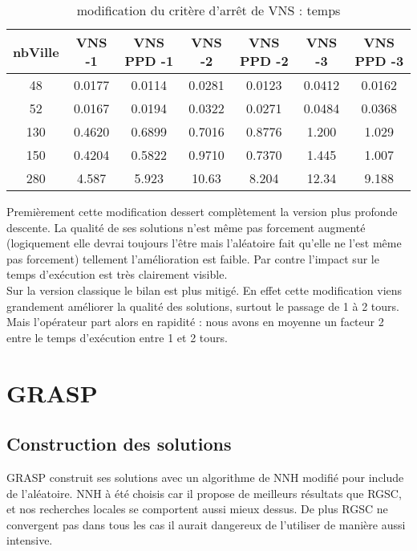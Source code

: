\documentclass[12pt,a4paper]{article}
\begin{document}
\begin{table}[!h]
\centering
\begin{tabular}{|*{7}{c|}}
  \hline
  nbVille & VNS -1 & VNS PPD -1 & VNS -2 & VNS PPD -2 & VNS -3 & VNS PPD -3 \\
  \hline
  48 & 0.0177 & 0.0114 & 0.0281 & 0.0123 & 0.0412 & 0.0162 \\ 
  52 & 0.0167 & 0.0194 & 0.0322 & 0.0271 & 0.0484 & 0.0368 \\
  130 & 0.4620 & 0.6899 & 0.7016 & 0.8776 & 1.200 & 1.029 \\
  150 & 0.4204 & 0.5822 & 0.9710 & 0.7370 & 1.445 & 1.007 \\  
  280 & 4.587 & 5.923 & 10.63 & 8.204 & 12.34 & 9.188 \\
  \hline
\end{tabular}
\caption{modification du critère d’arrêt de VNS : temps}
\label{stopingRuleVNStemps}
\end{table}

Premièrement cette modification dessert complètement la version plus profonde descente. La qualité de ses solutions n'est même pas forcement augmenté (logiquement elle devrai toujours l’être mais l’aléatoire fait qu'elle ne l'est même pas forcement) tellement l’amélioration est faible. Par contre l'impact sur le temps d’exécution est très clairement visible.\\

Sur la version classique le bilan est plus mitigé. En effet cette modification viens grandement améliorer la qualité des solutions, surtout le passage de 1 à 2 tours. Mais l'opérateur part alors en rapidité : nous avons en moyenne un facteur 2 entre le temps d’exécution entre 1 et 2 tours.\\ 

\section{GRASP}

\subsection{Construction des solutions}

GRASP construit ses solutions avec un algorithme de NNH modifié pour include de l'aléatoire. NNH à été choisis car il propose de meilleurs résultats que RGSC, et nos recherches locales se comportent aussi mieux dessus. De plus RGSC ne convergent pas dans tous les cas il aurait dangereux de l'utiliser de manière aussi intensive.\\
\end{document}
